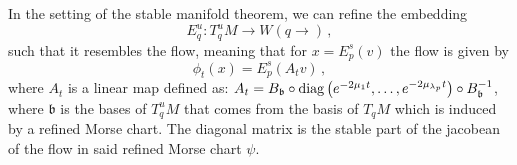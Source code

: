 \begin{theorem}
	In the setting of the stable manifold theorem, we can refine the embedding
\begin{equation*}
	E^u_q:T^u_q M \to W(q\to )\,, 
\end{equation*}
	such that it resembles the flow, meaning that for $x=E^s_p(v)$
	the flow is given by
	\begin{equation*}
		\phi_t(x)=E^s_p(A_tv)\, ,
	\end{equation*} where $A_t$ is a linear map defined as:
	$A_t=B_{\mathfrak{b}}\circ \mathrm{diag}\left(e^{-2\mu_{1} t},\dots,e^{-2\mu_{\lambda_p} t} \right)\circ B_{\mathfrak{b}}^{-1}$, where $\mathfrak{b}$ is the bases of $T^u_qM$ that comes from the basis of $T_qM$ which is induced by a refined Morse chart. The diagonal matrix is the stable part of the jacobean of the flow in said refined Morse chart $\psi$.
\end{theorem}
